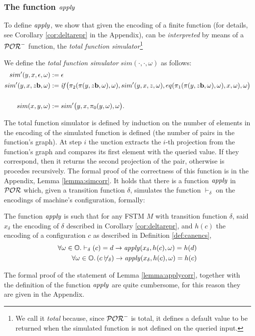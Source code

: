 \subsubsection{The function $\mathit{apply}$}
\label{subsub:apply}

To define $\mathit{apply}$, we show that given the encoding of a finite function
(for details, see Corollary \ref{cor:deltarepr} in the Appendix), can be
\emph{interpreted} by means of a $\mathcal{POR}^-$ function,
the \emph{total function simulator}\footnote{We call it \emph{total} because,
since $\mathcal{POR}^-$ is total, it defines a default value to be returned when the
simulated function is not defined on the queried input.}


\begin{defn}
We define the \emph{total function simulator}
$sim(\cdot, \cdot, \omega)$ as follows:
\begin{align*}
sim'(y,x,\eepsilon,\omega) &:= \eepsilon \\
%
sim'(y,x,z\bool, \omega) &:= \mathit{if}\big(\pi_2(\pi(y,z\bool,\omega),
\omega), sim'(y,x,z,\omega), eq(\pi_1(\pi(y,z\bool,\omega),
\omega), x,\omega), \omega\big) \\
\\
sim(x,y,\omega) &:= sim'\big(y,x,\pi_0(y,\omega),\omega\big).
\end{align*}
\end{defn}

The total function simulator is defined by induction on the number of elements
in the encoding of the simulated function is defined
(the number of pairs in the function's graph). At step $i$ the unction extracts the
$i$-th projection from the function's graph and compares its first element with
the queried value. If they correspond, then it returns the second projection of
the pair, otherwise is procedes recursively.
%
The formal proof of the correctness of this function is in the Appendix,
Lemma \ref{lemma:simcorr}.
%
It holds that there is a function $\mathit{apply}$ in $\mathcal{POR}$ which,
given a transition function $\delta$, simulates the function $\vdash_\delta$
on the encodings of machine's configuration, formally:

\begin{lemma}
  \label{lemma:applycorr}
  The function $\mathit{apply}$ is such that for any FSTM $M$ with transition function
  $\delta$, said $x_\delta$ the encoding of $\delta$ described in Corollary
  \ref{cor:deltarepr}, and $h(c)$ the encoding of a configuration $c$ as
  described in Definition \ref{def:canencs},
  \begin{align*}
    \forall \omega \in \mathbb{O}.\vdash_\delta(c)=d \to \mathit{apply}(x_\delta, h(c), \omega) = h(d)\\
    \forall \omega \in \mathbb{O}. \left(c \not\vdash_\delta\right ) \to \mathit{apply}(x_\delta, h(c), \omega) = h(c)
  \end{align*}
\end{lemma}
%
\noindent
The formal proof of the statement of Lemma \ref{lemma:applycorr}, together
with the definition of the function $\mathit{apply}$ are quite cumbersome, for this
reason they are given in the Appendix.
%
